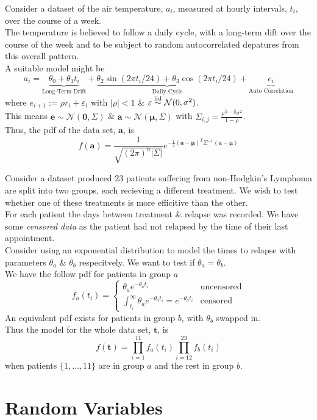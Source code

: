 \documentclass[11pt,a4paper]{article}
\begin{document}
Consider a dataset of the air temperature, $a_i$, measured at hourly intervals, $t_i$, over the course of a week.\\
The temperature is believed to follow a daily cycle, with a long-term dift over the course of the week and to be subject to random autocorrelated depatures from this overall pattern.\\
A suitable model might be
$$a_i=\underbrace{\theta_0+\theta_1t_i}_\text{Long-Term Drift}+\underbrace{\theta_2\sin(2\pi t_i/24)+\theta_3\cos(2\pi t_i/24)}_\text{Daily Cycle}+\underbrace{e_i}_\text{Auto Correlation}$$
where $e_{i+1}:=\rho r_i+\varepsilon_i$ with $|\rho|<1$ \& $\varepsilon\overset{\text{iid}}{\sim}\mathcal{N}(0,\sigma^2)$.\\
This means $\textbf{e}\sim\mathcal{N}(\pmb0,\Sigma)$ \& $\textbf{a}\sim\mathcal{N}(\pmb\mu,\Sigma)$ with $\Sigma_{i,j}=\frac{\rho^{|1-j|}\sigma^2}{1-\rho}$.\\
Thus, the pdf of the data set, $\textbf{a}$, is
$$f(\textbf{a})=\frac{1}{\sqrt{(2\pi)^n|\Sigma|}}e^{-\frac{1}{2}(\textbf{a}-\pmb\mu)^T\Sigma^{-1}(\textbf{a}-\pmb\mu)}$$

Consider a dataset produced 23 patients suffering from non-Hodgkin's Lymphoma are split into two groups, each recieving a different treatment. We wish to test whether one of these treatments is more efficitive than the other.\\
For each patient the days between treatment \& relapse was recorded. We have some \textit{censored data} as the patient had not relapsed by the time of their last appointment.\\
Consider using an exponential distribution to model the times to relapse with parameters $\theta_a$ \& $\theta_b$ respecitvely. We want to test if $\theta_a=\theta_b$.\\
We have the follow pdf for patients in group $a$
$$f_a(t_i)=\begin{cases}\theta_ae^{-\theta_at_i}&\text{uncensored}\\\int_{t_i}^\infty\theta_ae^{-\theta_at_i}=e^{-\theta_at_i}&\text{censored}\end{cases}$$
An equivalent pdf exists for patients in group $b$, with $\theta_b$ swapped in.\\
Thus the model for the whole data set, $\textbf{t}$, is
$$f(\textbf{t})=\prod_{i=1}^{11}f_a(t_i)\prod_{i=12}^{23}f_b(t_i)$$
when patients $\{1,\dots,11\}$ are in group $a$ and the rest in group $b$.

\section{Random Variables}
\end{document}
